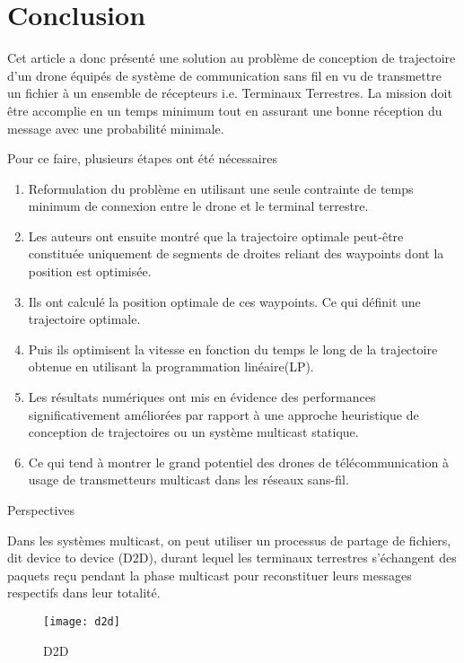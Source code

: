 \section{Conclusion}


\begin{frame} {}

Cet article a donc présenté une solution au problème de conception
de trajectoire d'un drone équipés de système de communication sans fil
en vu de transmettre un fichier à un ensemble de récepteurs i.e. Terminaux Terrestres. 
La mission doit être accomplie en un temps minimum tout en assurant une bonne réception
du message avec une probabilité minimale.

\end{frame}

\begin{frame} {}
 Pour ce faire, plusieurs étapes ont été nécessaires\pause

\begin{enumerate}
	\item Reformulation du problème en utilisant une seule contrainte
	de temps minimum de connexion entre le drone et le terminal terrestre.\pause
	
	\item Les auteurs ont ensuite montré que la trajectoire optimale
	peut-être constituée uniquement de segments de droites reliant des
	waypoints dont la position est optimisée.\pause
	\item Ils ont calculé la position optimale de ces waypoints.
	Ce qui définit une trajectoire optimale. \pause  
	\item Puis ils optimisent la vitesse en fonction du temps le long de la trajectoire obtenue
	en utilisant la programmation linéaire(LP).\pause
	\item Les résultats numériques ont mis en évidence des performances significativement améliorées
	 par rapport à une approche heuristique de conception de trajectoires ou un système multicast statique.\pause
	\item Ce qui tend à montrer le grand potentiel des drones de 
	télécommunication à usage de transmetteurs multicast dans les réseaux sans-fil.
	 
\end{enumerate}
\end{frame}


\begin{frame} {Perspectives}

Dans les systèmes multicast, on peut utiliser un processus de partage de fichiers,
dit device to device (D2D), durant lequel les terminaux terrestres
s'échangent des paquets reçu pendant la phase multicast pour reconstituer leurs messages
respectifs dans leur totalité. 

 \begin{figure}[t]
	\centering
	\texttt{[image: d2d]}
	\caption{D2D}
\end{figure}

\end{frame}


